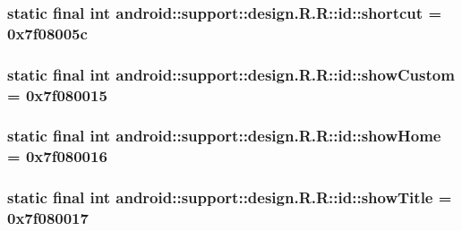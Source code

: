 \hypertarget{classandroid_1_1support_1_1design_1_1_r_1_1id_09f2abcdf7212fa2932fd5863e9479a2}{
\subsubsection[{shortcut}]{\setlength{\rightskip}{0pt plus 5cm}static final int android::support::design.R.R::id::shortcut = 0x7f08005c}}
\label{classandroid_1_1support_1_1design_1_1_r_1_1id_09f2abcdf7212fa2932fd5863e9479a2}


\hypertarget{classandroid_1_1support_1_1design_1_1_r_1_1id_27bd742f0b2b535ba1a873972533f016}{
\subsubsection[{showCustom}]{\setlength{\rightskip}{0pt plus 5cm}static final int android::support::design.R.R::id::showCustom = 0x7f080015}}
\label{classandroid_1_1support_1_1design_1_1_r_1_1id_27bd742f0b2b535ba1a873972533f016}


\hypertarget{classandroid_1_1support_1_1design_1_1_r_1_1id_b1bf2f3fb5e104cca8d4a4c7f349b97d}{
\subsubsection[{showHome}]{\setlength{\rightskip}{0pt plus 5cm}static final int android::support::design.R.R::id::showHome = 0x7f080016}}
\label{classandroid_1_1support_1_1design_1_1_r_1_1id_b1bf2f3fb5e104cca8d4a4c7f349b97d}


\hypertarget{classandroid_1_1support_1_1design_1_1_r_1_1id_ff3da9b481ea9e835229b3d1f7b1f10a}{
\subsubsection[{showTitle}]{\setlength{\rightskip}{0pt plus 5cm}static final int android::support::design.R.R::id::showTitle = 0x7f080017}}
\label{classandroid_1_1support_1_1design_1_1_r_1_1id_ff3da9b481ea9e835229b3d1f7b1f10a}


